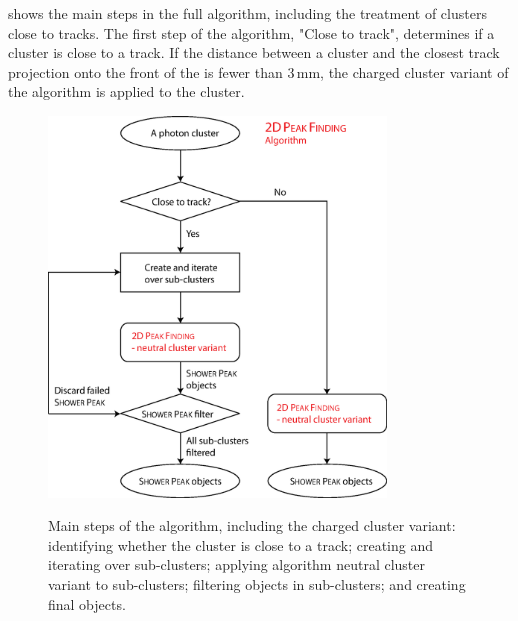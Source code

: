 


 shows the main steps in the full \peakFinding algorithm, including the treatment of clusters close to tracks. The first step of the algorithm, "Close to track", determines if a cluster is close to a track. If the distance between a cluster and the closest track projection onto the front of the \ECAL is fewer than 3\,mm, the charged cluster variant of the \peakFinding algorithm is applied to the cluster.

\begin{figure}[tbph]
\centering
{\includegraphics[width=0.8\textwidth]{photon/2DpeakFindingTrack2}}
\caption[Flow chart for \peakFinding algorithm.]
{Main steps of the  \peakFinding algorithm, including the charged cluster variant: identifying whether the cluster is close to a track; creating and iterating over sub-clusters; applying \peakFinding algorithm neutral cluster variant to sub-clusters; filtering \ShowerPeak objects in sub-clusters; and creating final \ShowerPeak objects.}
\label{fig:photonPeakFindingFlow}
\end{figure}


